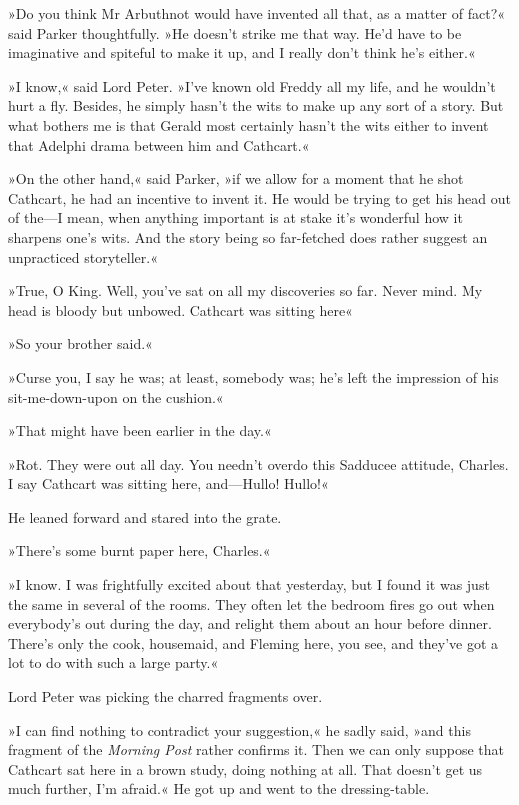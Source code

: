 »Do you think Mr Arbuthnot would have invented all that, as a matter of fact?« said Parker thoughtfully. »He doesn't strike me that way. He'd have to be imaginative and spiteful to make it up, and I really don't think he's either.«

»I know,« said Lord Peter. »I've known old Freddy all my life, and he wouldn't hurt a fly. Besides, he simply hasn't the wits to make up any sort of a story. But what bothers me is that Gerald most certainly hasn't the wits either to invent that Adelphi drama between him and Cathcart.«

»On the other hand,« said Parker, »if we allow for a moment that he shot Cathcart, he had an incentive to invent it. He would be trying to get his head out of the\allowbreak---\allowbreak I mean, when anything important is at stake it's wonderful how it sharpens one's wits. And the story being so far-fetched does rather suggest an unpracticed storyteller.«

»True, O King. Well, you've sat on all my discoveries so far. Never mind. My head is bloody but unbowed. Cathcart was sitting here\longdash«

»So your brother said.«

»Curse you, I say he was; at least, somebody was; he's left the impression of his sit-me-down-upon on the cushion.«

»That might have been earlier in the day.«

»Rot. They were out all day. You needn't overdo this Sadducee attitude, Charles. I say Cathcart was sitting here, and\allowbreak---\allowbreak Hullo! Hullo!«

He leaned forward and stared into the grate.

»There's some burnt paper here, Charles.«

»I know. I was frightfully excited about that yesterday, but I found it was just the same in several of the rooms. They often let the bedroom fires go out when everybody's out during the day, and relight them about an hour before dinner. There's only the cook, housemaid, and Fleming here, you see, and they've got a lot to do with such a large party.«

Lord Peter was picking the charred fragments over.

»I can find nothing to contradict your suggestion,« he sadly said, »and this fragment of the \textit{Morning Post} rather confirms it. Then we can only suppose that Cathcart sat here in a brown study, doing nothing at all. That doesn't get us much further, I'm afraid.« He got up and went to the dressing-table.

